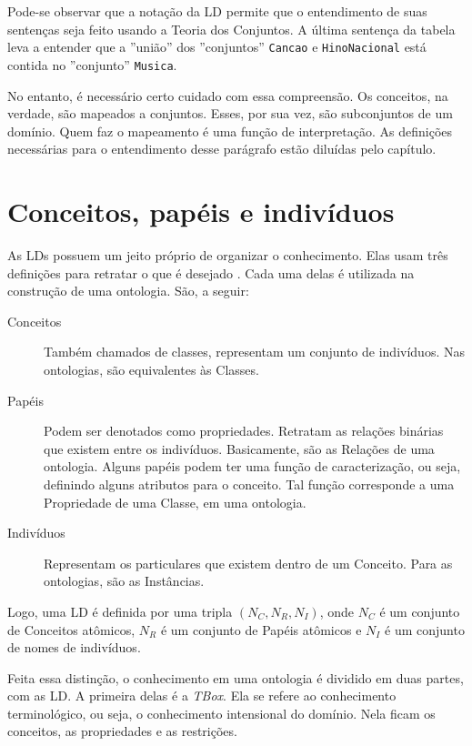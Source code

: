 Pode-se observar que a notação da LD permite que o entendimento de suas sentenças seja feito usando a Teoria dos Conjuntos. A última sentença da tabela leva a entender que a ''união'' dos ''conjuntos'' \texttt{Cancao} e \texttt{HinoNacional} está contida no ''conjunto'' \texttt{Musica}.

No entanto, é necessário certo cuidado com essa compreensão. Os conceitos, na verdade, são mapeados a conjuntos. Esses, por sua vez, são subconjuntos de um domínio. Quem faz o mapeamento é uma função de interpretação. As definições necessárias para o entendimento desse parágrafo estão diluídas pelo capítulo.

\section{Conceitos, papéis e indivíduos}

As LDs possuem um jeito próprio de organizar o conhecimento. Elas usam três definições para retratar o que é desejado \citep{logicaVan}. Cada uma delas é utilizada na construção de uma ontologia. São, a seguir:

\begin{description}
	\item[Conceitos] Também chamados de classes, representam um conjunto de indivíduos. Nas ontologias, são equivalentes às Classes.
	\item[Papéis] Podem ser denotados como propriedades. Retratam as relações binárias que existem entre os indivíduos. Basicamente, são as Relações de uma ontologia. Alguns papéis podem ter uma função de caracterização, ou seja, definindo alguns atributos para o conceito. Tal função corresponde a uma Propriedade de uma Classe, em uma ontologia.
	\item[Indivíduos] Representam os particulares que existem dentro de um Conceito. Para as ontologias, são as Instâncias.
\end{description}

Logo, uma LD é definida por uma tripla $ (N_C, N_R, N_I) $, onde $ N_C $ é um conjunto de Conceitos atômicos, $ N_R $ é um conjunto de Papéis atômicos e $ N_I $ é um conjunto de nomes de indivíduos.

Feita essa distinção, o conhecimento em uma ontologia é dividido em duas partes, com as LD. A primeira delas é a \textit{TBox}. Ela se refere ao conhecimento terminológico, ou seja, o conhecimento intensional do domínio. Nela ficam os conceitos, as propriedades e as restrições.

